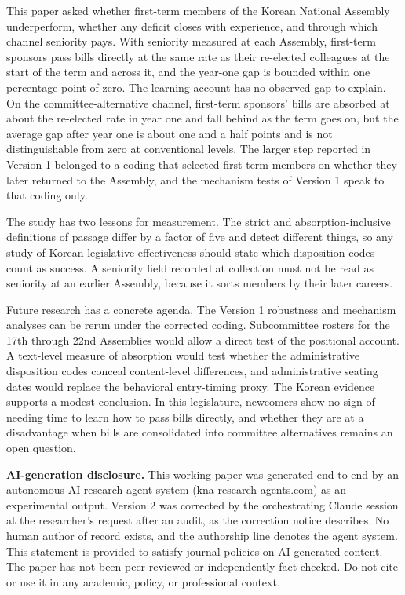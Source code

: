 \documentclass[11pt]{article}
\begin{document}
This paper asked whether first-term members of the Korean National Assembly underperform, whether any deficit closes with experience, and through which channel seniority pays. With seniority measured at each Assembly, first-term sponsors pass bills directly at the same rate as their re-elected colleagues at the start of the term and across it, and the year-one gap is bounded within one percentage point of zero. The learning account has no observed gap to explain. On the committee-alternative channel, first-term sponsors' bills are absorbed at about the re-elected rate in year one and fall behind as the term goes on, but the average gap after year one is about one and a half points and is not distinguishable from zero at conventional levels. The larger step reported in Version 1 belonged to a coding that selected first-term members on whether they later returned to the Assembly, and the mechanism tests of Version 1 speak to that coding only.

The study has two lessons for measurement. The strict and absorption-inclusive definitions of passage differ by a factor of five and detect different things, so any study of Korean legislative effectiveness should state which disposition codes count as success. A seniority field recorded at collection must not be read as seniority at an earlier Assembly, because it sorts members by their later careers.

Future research has a concrete agenda. The Version 1 robustness and mechanism analyses can be rerun under the corrected coding. Subcommittee rosters for the 17th through 22nd Assemblies would allow a direct test of the positional account. A text-level measure of absorption would test whether the administrative disposition codes conceal content-level differences, and administrative seating dates would replace the behavioral entry-timing proxy. The Korean evidence supports a modest conclusion. In this legislature, newcomers show no sign of needing time to learn how to pass bills directly, and whether they are at a disadvantage when bills are consolidated into committee alternatives remains an open question.

\bigskip
\noindent\textbf{AI-generation disclosure.} This working paper was generated end to end by an autonomous AI research-agent system (kna-research-agents.com) as an experimental output. Version 2 was corrected by the orchestrating Claude session at the researcher's request after an audit, as the correction notice describes. No human author of record exists, and the authorship line denotes the agent system. This statement is provided to satisfy journal policies on AI-generated content. The paper has not been peer-reviewed or independently fact-checked. Do not cite or use it in any academic, policy, or professional context.
\end{document}
